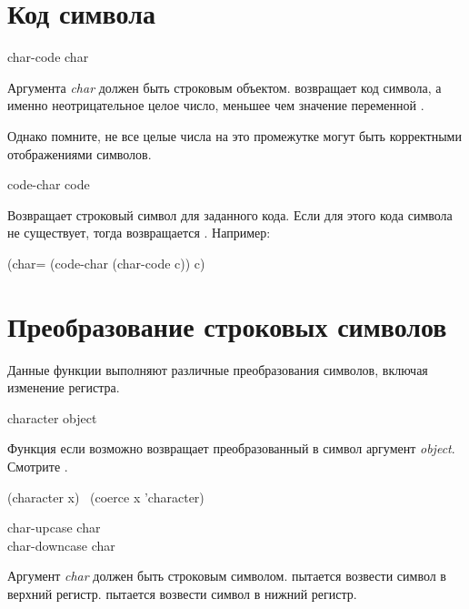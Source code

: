 \section{Код символа}

\begin{defun}[Функция]
char-code char

Аргумента \emph{char} должен быть строковым объектом.
 возвращает код символа, а именно неотрицательное целое число,
меньшее чем значение переменной .

Однако помните, не все целые числа на это промежутке могут быть корректными
отображениями символов.
\end{defun}

\begin{defun}[Функция]
code-char code

Возвращает строковый символ для заданного кода. Если для этого кода символа не
существует, тогда возвращается {\nil}.
Например:
\begin{lisp}
(char= (code-char (char-code c)) c)
\end{lisp}
\end{defun}

\section{Преобразование строковых символов}

Данные функции выполняют различные преобразования символов, включая изменение
регистра.

\begin{defun}[Функция]
character object

Функция  если возможно возвращает преобразованный в символ
аргумент \emph{object}. Смотрите .
\begin{lisp}
(character x) \EQ\ (coerce x 'character)
\end{lisp}
\end{defun}

\begin{defun}[Функция]
char-upcase char \\
char-downcase char

Аргумент \emph{char} должен быть строковым символом.
 пытается возвести символ в верхний
регистр.  пытается возвести символ в нижний регистр.
\end{defun}

